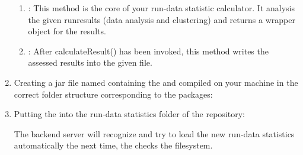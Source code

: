 \begin{enumerate}
\begin{enumerate}
			\item {}: This method is the core of your run-data statistic calculator. It analysis the given runresults (data analysis and clustering) and returns a wrapper object for the results.
			\item {}: After calculateResult() has been invoked, this method writes the assessed results into the given file.
		\end{enumerate}
		
			\item Creating a jar file named  containing the  and  compiled on your machine in the correct folder structure corresponding to the packages:
			
			
			
			\item Putting the  into the run-data statistics folder of the repository:
			
			\highlight{\reposupprundatastats}
			
			The backend server will recognize and try to load the new run-data statistics automatically the next time, the  checks the filesystem.
		\end{enumerate}